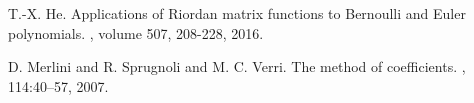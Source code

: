 



\begin{thebibliography}{10}


\bibitem{}

T.-X. He.
\newblock Applications of Riordan matrix functions to Bernoulli and Euler polynomials.
, volume 507, 208-228, 2016.

D. Merlini and R. Sprugnoli and M. C. Verri.
\newblock The method of coefficients.
, 114:40--57, 2007.

\end{thebibliography}


